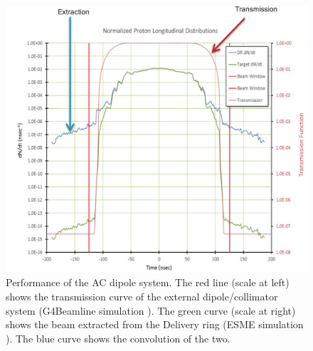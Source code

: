 \documentclass[12pt,a4paper,openright, oneside, titlepage]{book} %
\begin{document}
\begin{figure}[h!]
\centering
\includegraphics[scale=0.3]{Extinction}
\caption[AC dipole extinction performance]{Performance of the AC dipole system\cite{bob_mu2e}. The red line (scale at left) shows the transmission curve of the external dipole/collimator system (G4Beamline simulation \cite{G4beamline}). The green curve (scale at right) shows the beam extracted from the Delivery ring (ESME simulation \cite{ESME}). The blue curve shows the convolution of the two.}
\label{_Extinction}
\end{figure}
\end{document}
